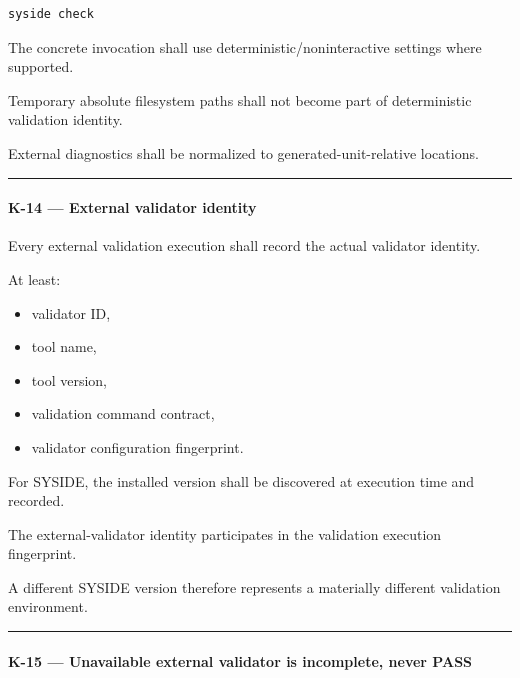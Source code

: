 \begin{verbatim}
syside check
\end{verbatim}

The concrete invocation shall use deterministic/noninteractive settings where supported.

Temporary absolute filesystem paths shall not become part of deterministic validation identity.

External diagnostics shall be normalized to generated-unit-relative locations.

\begin{center}\rule{0.5\linewidth}{0.5pt}\end{center}

\hypertarget{k-14--external-validator-identity}{%
\paragraph{K-14 --- External validator identity}\label{k-14--external-validator-identity}}

Every external validation execution shall record the actual validator identity.

At least:

\begin{itemize}
\tightlist
\item
  validator ID,
\item
  tool name,
\item
  tool version,
\item
  validation command contract,
\item
  validator configuration fingerprint.
\end{itemize}

For SYSIDE, the installed version shall be discovered at execution time and recorded.

The external-validator identity participates in the validation execution fingerprint.

A different SYSIDE version therefore represents a materially different validation environment.

\begin{center}\rule{0.5\linewidth}{0.5pt}\end{center}

\hypertarget{k-15--unavailable-external-validator-is-incomplete-never-pass}{%
\paragraph{K-15 --- Unavailable external validator is incomplete, never PASS}\label{k-15--unavailable-external-validator-is-incomplete-never-pass}}

